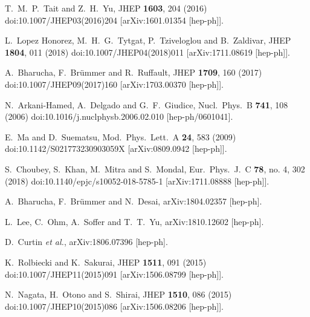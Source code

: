 \documentclass[nofootinbib,prd,aps,superscriptaddress,preprintnumbers]{revtex4}
\begin{document}
\begin{thebibliography}{99}
  T.~M.~P.~Tait and Z.~H.~Yu,
  JHEP {\bf 1603}, 204 (2016)
  doi:10.1007/JHEP03(2016)204
  [arXiv:1601.01354 [hep-ph]].

  L.~Lopez Honorez, M.~H.~G.~Tytgat, P.~Tziveloglou and B.~Zaldivar,
  JHEP {\bf 1804}, 011 (2018)
  doi:10.1007/JHEP04(2018)011
  [arXiv:1711.08619 [hep-ph]].

  A.~Bharucha, F.~Br\"ummer and R.~Ruffault,
  JHEP {\bf 1709}, 160 (2017)
  doi:10.1007/JHEP09(2017)160
  [arXiv:1703.00370 [hep-ph]].

  N.~Arkani-Hamed, A.~Delgado and G.~F.~Giudice,
  Nucl.\ Phys.\ B {\bf 741}, 108 (2006)
  doi:10.1016/j.nuclphysb.2006.02.010
  [hep-ph/0601041].

  E.~Ma and D.~Suematsu,
  Mod.\ Phys.\ Lett.\ A {\bf 24}, 583 (2009)
  doi:10.1142/S021773230903059X
  [arXiv:0809.0942 [hep-ph]].

  S.~Choubey, S.~Khan, M.~Mitra and S.~Mondal,
  Eur.\ Phys.\ J.\ C {\bf 78}, no. 4, 302 (2018)
  doi:10.1140/epjc/s10052-018-5785-1
  [arXiv:1711.08888 [hep-ph]].

  A.~Bharucha, F.~Br\"ummer and N.~Desai,
  arXiv:1804.02357 [hep-ph].

  L.~Lee, C.~Ohm, A.~Soffer and T.~T.~Yu,
  arXiv:1810.12602 [hep-ph].

  D.~Curtin {\it et al.},
  arXiv:1806.07396 [hep-ph].

  K.~Rolbiecki and K.~Sakurai,
  JHEP {\bf 1511}, 091 (2015)
  doi:10.1007/JHEP11(2015)091
  [arXiv:1506.08799 [hep-ph]].

  N.~Nagata, H.~Otono and S.~Shirai,
  JHEP {\bf 1510}, 086 (2015)
  doi:10.1007/JHEP10(2015)086
  [arXiv:1506.08206 [hep-ph]].


\end{thebibliography}
\end{document}
